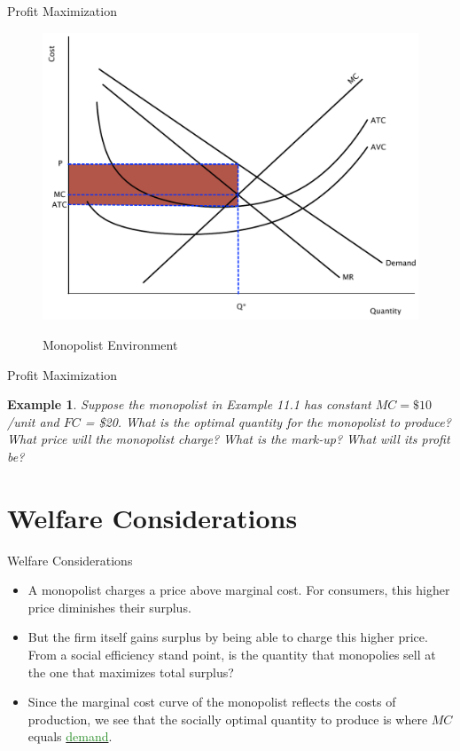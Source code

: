 \documentclass[xcolor={dvipsnames},pdf, hyperref={colorlinks=true, citecolor=ForestGreen, linkcolor=BlueViolet, urlcolor=Magenta}]{beamer}
\newtheorem{exmp}{Example}[section]
\newcommand{\ddp}[1]{{\textcolor{ForestGreen}{#1}}}
\newcommand{\dd}[1]{{\underline{\textcolor{ForestGreen}{#1}}}}
\begin{document}
\begin{frame}[b]{Profit Maximization}
	\begin{figure}[H]
	\centering
	\ddp{\includegraphics[scale=.40]{plot75.pdf}}
	\caption{Monopolist Environment}
\end{figure}
\end{frame}

\begin{frame}{Profit Maximization}
	\begin{exmp}
	Suppose the monopolist in Example 11.1 has constant $MC=\$10$/unit and $FC$ = \$20. What is the optimal quantity for the monopolist to produce? What price will the monopolist charge? What is the mark-up? What will its profit be?
\end{exmp}
\pause \ddp{If MC=\$10, monopolist will produce 6 units and charge a price of \$15. \\ 
	The mark-up over the marginal cost is \$5. \\
	VC of producing 6 units = \$60 since MC is constant \$10. $\Pi = 90 - (60 + 20) = \$10$.}
\end{frame}

\section{Welfare Considerations}

\begin{frame}{Welfare Considerations}
\begin{itemize}
	\item 	A monopolist charges a price above marginal cost. For consumers, this higher price diminishes their surplus. 
	\item But the firm itself gains surplus by being able to charge this higher price. From a social efficiency stand point, is the quantity that monopolies sell at the one that maximizes total surplus?
	\item Since the marginal cost curve of the monopolist reflects the costs of production, we see that the socially optimal quantity to produce is where $MC$ equals \dd{demand}.
\end{itemize}

\end{frame}
\end{document}
